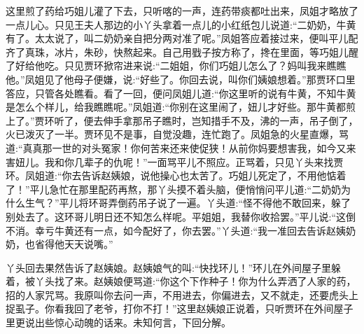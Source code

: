 \begin{parag}
    这里煎了药给巧姐儿灌了下去，只听喀的一声，连药带痰都吐出来，凤姐才略放了一点儿心。只见王夫人那边的小丫头拿着一点儿的小红纸包儿说道:“二奶奶，牛黄有了。太太说了，叫二奶奶亲自把分两对准了呢。”凤姐答应着接过来，便叫平儿配齐了真珠，冰片，朱砂，快熬起来。自己用戥子按方称了，搀在里面，等巧姐儿醒了好给他吃。只见贾环掀帘进来说:“二姐姐，你们巧姐儿怎么了？妈叫我来瞧瞧他。”凤姐见了他母子便嫌，说:“好些了。你回去说，叫你们姨娘想着。”那贾环口里答应，只管各处瞧看。看了一回，便问凤姐儿道:“你这里听的说有牛黄，不知牛黄是怎么个样儿，给我瞧瞧呢。”凤姐道:“你别在这里闹了，妞儿才好些。那牛黄都煎上了。”贾环听了，便去伸手拿那吊子瞧时，岂知措手不及，沸的一声，吊子倒了，火已泼灭了一半。贾环见不是事，自觉没趣，连忙跑了。凤姐急的火星直爆，骂道:“真真那一世的对头冤家！你何苦来还来使促狭！从前你妈要想害我，如今又来害妞儿。我和你几辈子的仇呢！”一面骂平儿不照应。正骂着，只见丫头来找贾环。凤姐道:“你去告诉赵姨娘，说他操心也太苦了。巧姐儿死定了，不用他惦着了！”平儿急忙在那里配药再熬，那丫头摸不着头脑，便悄悄问平儿道:“二奶奶为什么生气？”平儿将环哥弄倒药吊子说了一遍。丫头道:“怪不得他不敢回来，躲了别处去了。这环哥儿明日还不知怎么样呢。平姐姐，我替你收拾罢。”平儿说:“这倒不消。幸亏牛黄还有一点，如今配好了，你去罢。”丫头道:“我一准回去告诉赵姨奶奶，也省得他天天说嘴。”
\end{parag}


\begin{parag}
    丫头回去果然告诉了赵姨娘。赵姨娘气的叫:“快找环儿！”环儿在外间屋子里躲着，被丫头找了来。赵姨娘便骂道:“你这个下作种子！你为什么弄洒了人家的药，招的人家咒骂。我原叫你去问一声，不用进去，你偏进去，又不就走，还要虎头上捉虱子。你看我回了老爷，打你不打！”这里赵姨娘正说着，只听贾环在外间屋子里更说出些惊心动魄的话来。未知何言，下回分解。
\end{parag}